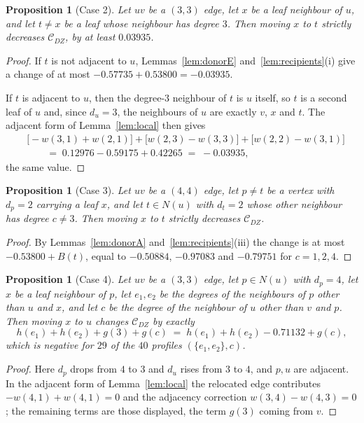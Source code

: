 \documentclass[11pt,a4paper]{article}
\theoremstyle{plain}
\newtheorem{proposition}[theorem]{Proposition}
\theoremstyle{definition}
\theoremstyle{remark}
\newcommand{\CDZ}{\mathcal{C}_{DZ}}
\begin{document}
\begin{proposition}[Case 2]
\label{prop:case2}
Let $uv$ be a $(3,3)$ edge, let $x$ be a leaf neighbour of $u$, and let $t\ne x$
be a leaf whose neighbour has degree $3$. Then moving $x$ to $t$ strictly
decreases $\CDZ$, by at least $0.03935$.
\end{proposition}

\begin{proof}
If $t$ is not adjacent to $u$, Lemmas~\ref{lem:donorE}
and~\ref{lem:recipients}(i) give a change of at most
$-0.57735+0.53800=-0.03935$.

If $t$ is adjacent to $u$, then the degree-$3$ neighbour of $t$ is $u$ itself, so
$t$ is a second leaf of $u$ and, since $d_u=3$, the neighbours of $u$ are exactly
$v$, $x$ and $t$. The adjacent form of Lemma~\ref{lem:local} then gives
\begin{align*}
  &\bigl[-w(3,1)+w(2,1)\bigr]+\bigl[w(2,3)-w(3,3)\bigr]+\bigl[w(2,2)-w(3,1)\bigr]\\
  &\qquad=\;0.12976-0.59175+0.42265\;=\;-0.03935,
\end{align*}
the same value.
\end{proof}

\begin{proposition}[Case 3]
\label{prop:case3}
Let $uv$ be a $(4,4)$ edge, let $p\ne t$ be a vertex with $d_p=2$ carrying a leaf
$x$, and let $t\in N(u)$ with $d_t=2$ whose other neighbour has degree $c\ne3$.
Then moving $x$ to $t$ strictly decreases $\CDZ$.
\end{proposition}

\begin{proof}
By Lemmas~\ref{lem:donorA} and~\ref{lem:recipients}(iii) the change is at most
$-0.53800+B(t)$, equal to $-0.50884$, $-0.97083$ and $-0.79751$ for $c=1,2,4$.
\end{proof}

\begin{proposition}[Case 4]
\label{prop:case4}
Let $uv$ be a $(3,3)$ edge, let $p\in N(u)$ with $d_p=4$, let $x$ be a leaf
neighbour of $p$, let $e_1,e_2$ be the degrees of the neighbours of $p$ other
than $u$ and $x$, and let $c$ be the degree of the neighbour of $u$ other than
$v$ and $p$. Then moving $x$ to $u$ changes $\CDZ$ by exactly
\[
  h(e_1)+h(e_2)+g(3)+g(c)\;=\;h(e_1)+h(e_2)-0.71132+g(c),
\]
which is negative for $29$ of the $40$ profiles $(\{e_1,e_2\},c)$.
\end{proposition}

\begin{proof}
Here $d_p$ drops from $4$ to $3$ and $d_u$ rises from $3$ to $4$, and $p,u$ are
adjacent. In the adjacent form of Lemma~\ref{lem:local} the relocated edge
contributes $-w(4,1)+w(4,1)=0$ and the adjacency correction
$w(3,4)-w(4,3)=0$; the remaining terms are those displayed, the term $g(3)$
coming from $v$.
\end{proof}
\end{document}
